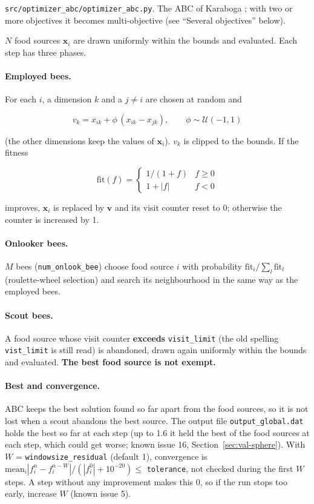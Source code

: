 \documentclass[11pt,a4paper]{article}
\begin{document}
\texttt{src/optimizer\_abc/optimizer\_abc.py}. The ABC of Karaboga \cite{karaboga2005,karaboga2007}; with two or more objectives it becomes multi-objective (see ``Several objectives'' below).

$N$ food sources $\mathbf{x}_i$ are drawn uniformly within the bounds and evaluated. Each step has three phases.

\paragraph{Employed bees.} For each $i$, a dimension $k$ and a $j \ne i$ are chosen at random and

\begin{equation}
  v_{k} = x_{ik} + \phi\,(x_{ik} - x_{jk}),\qquad \phi \sim \mathcal{U}(-1, 1)
\end{equation}

(the other dimensions keep the values of $\mathbf{x}_i$). $v_k$ is clipped to the bounds. If the fitness

\begin{equation}
  \mathrm{fit}(f) = \begin{cases} 1/(1+f) & f \ge 0 \\ 1 + |f| & f < 0 \end{cases}
\end{equation}

improves, $\mathbf{x}_i$ is replaced by $\mathbf{v}$ and its visit counter reset to 0; otherwise the counter is increased by 1.

\paragraph{Onlooker bees.} $M$ bees (\texttt{num\_onlook\_bee}) choose food source $i$ with probability $\mathrm{fit}_i / \sum_l \mathrm{fit}_l$ (roulette-wheel selection) and search its neighbourhood in the same way as the employed bees.

\paragraph{Scout bees.} A food source whose visit counter \textbf{exceeds} \texttt{visit\_limit} (the old spelling \texttt{vist\_limit} is still read) is abandoned, drawn again uniformly within the bounds and evaluated. \textbf{The best food source is not exempt.}

\paragraph{Best and convergence.} ABC keeps the best solution found so far apart from the food sources, so it is not lost when a scout abandons the best source. The output file \texttt{output\_global.dat} holds the best so far at each step (up to 1.6 it held the best of the food sources at each step, which could get worse; known issue 16, Section~\ref{sec:val-sphere}). With $W$ = \texttt{windowsize\_residual} (default 1), convergence is $\mathrm{mean}_i |f_i^n - f_i^{n-W}| / (|f_i^{0}| + 10^{-20}) \le$ \texttt{tolerance}, not checked during the first $W$ steps. A step without any improvement makes this 0, so if the run stops too early, increase $W$ (known issue 5).
\end{document}
